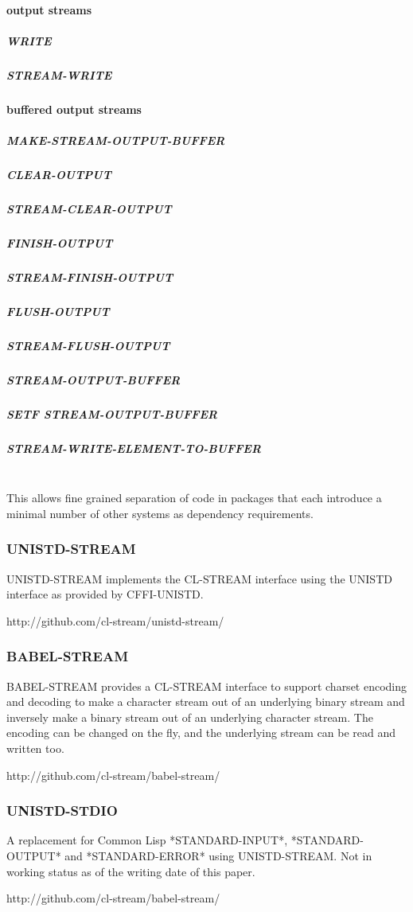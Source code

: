 \documentclass[sigconf]{acmart}
\begin{document}
\paragraph{output streams}
\subparagraph{WRITE}
\subparagraph{STREAM-WRITE}

\paragraph{buffered output streams}
\subparagraph{MAKE-STREAM-OUTPUT-BUFFER}
\subparagraph{CLEAR-OUTPUT}
\subparagraph{STREAM-CLEAR-OUTPUT}
\subparagraph{FINISH-OUTPUT}
\subparagraph{STREAM-FINISH-OUTPUT}
\subparagraph{FLUSH-OUTPUT}
\subparagraph{STREAM-FLUSH-OUTPUT}
\subparagraph{STREAM-OUTPUT-BUFFER}
\subparagraph{SETF STREAM-OUTPUT-BUFFER}
\subparagraph{STREAM-WRITE-ELEMENT-TO-BUFFER}
~\\

This allows fine grained separation of code in packages that each
introduce a minimal number of other systems as dependency requirements.


\subsubsection{UNISTD-STREAM}
UNISTD-STREAM implements the CL-STREAM interface using the UNISTD
interface as provided by CFFI-UNISTD.

http://github.com/cl-stream/unistd-stream/

\subsubsection{BABEL-STREAM}
BABEL-STREAM provides a CL-STREAM interface to support charset encoding
and decoding to make a character stream out of an underlying binary
stream and inversely make a binary stream out of an underlying character
stream. The encoding can be changed on the fly, and the underlying
stream can be read and written too.

http://github.com/cl-stream/babel-stream/

\subsubsection{UNISTD-STDIO}
A replacement for Common Lisp *STANDARD-INPUT*, *STANDARD-OUTPUT*
and *STANDARD-ERROR* using UNISTD-STREAM. Not in working status as of
the writing date of this paper.

http://github.com/cl-stream/babel-stream/
\end{document}
